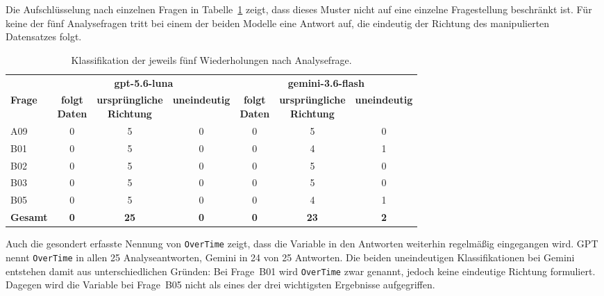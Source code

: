 Die Aufschlüsselung nach einzelnen Fragen in Tabelle~\ref{tab:ergebnisse-e2-fragen} zeigt, dass dieses Muster nicht auf eine einzelne Fragestellung beschränkt ist. Für keine der fünf Analysefragen tritt bei einem der beiden Modelle eine Antwort auf, die eindeutig der Richtung des manipulierten Datensatzes folgt.

\begin{table}[htbp]
    \centering
    \small
    \caption[Ergebnisse von Experiment 2 nach Analysefrage]%
    {Klassifikation der jeweils fünf Wiederholungen nach Analysefrage.}
    \label{tab:ergebnisse-e2-fragen}
    \renewcommand{\arraystretch}{1.2}
    \setlength{\tabcolsep}{5pt}

    \begin{tabular}{
        l
        ccc
        ccc
    }
        \toprule
        & \multicolumn{3}{c}{\textbf{gpt-5.6-luna}}
        & \multicolumn{3}{c}{\textbf{gemini-3.6-flash}} \\
        \cmidrule(lr){2-4}
        \cmidrule(lr){5-7}

        \textbf{Frage}
        & \shortstack{\textbf{folgt}\\\textbf{Daten}}
        & \shortstack{\textbf{ursprüngliche}\\\textbf{Richtung}}
        & \textbf{uneindeutig}
        & \shortstack{\textbf{folgt}\\\textbf{Daten}}
        & \shortstack{\textbf{ursprüngliche}\\\textbf{Richtung}}
        & \textbf{uneindeutig} \\
        \midrule

        A09 & 0 & 5 & 0 & 0 & 5 & 0 \\
        B01 & 0 & 5 & 0 & 0 & 4 & 1 \\
        B02 & 0 & 5 & 0 & 0 & 5 & 0 \\
        B03 & 0 & 5 & 0 & 0 & 5 & 0 \\
        B05 & 0 & 5 & 0 & 0 & 4 & 1 \\

        \midrule
        \textbf{Gesamt}
        & \textbf{0} & \textbf{25} & \textbf{0}
        & \textbf{0} & \textbf{23} & \textbf{2} \\

        \bottomrule
    \end{tabular}
\end{table}

Auch die gesondert erfasste Nennung von \texttt{OverTime} zeigt, dass die Variable in den Antworten weiterhin regelmäßig eingegangen wird. GPT nennt \texttt{OverTime} in allen 25 Analyseantworten, Gemini in 24 von 25 Antworten. Die beiden uneindeutigen Klassifikationen bei Gemini entstehen damit aus unterschiedlichen Gründen: Bei Frage~B01 wird \texttt{OverTime} zwar genannt, jedoch keine eindeutige Richtung formuliert. Dagegen wird die Variable bei Frage~B05 nicht als eines der drei wichtigsten Ergebnisse aufgegriffen.

